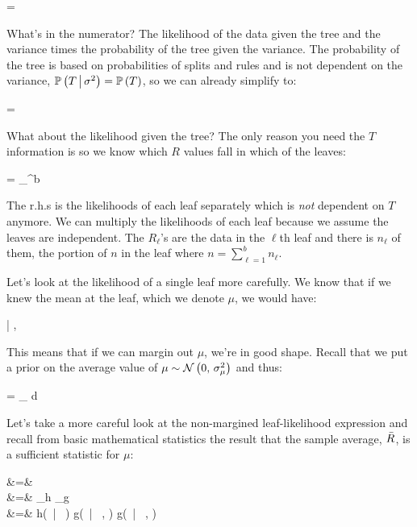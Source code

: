 \beqn
{} = 
\eeqn

What's in the numerator? The likelihood of the data given the tree and the variance times the probability of the tree given the variance. The probability of the tree is based on probabilities of splits and rules and is not dependent on the variance, $\mathbb{P}\left(T \, \big| \, \sigma^2\right) = \mathbb{P}\left(T\right)$, so we can already simplify to:

\beqn
{} = 
\eeqn

What about the likelihood given the tree? The only reason you need the $T$ information is so we know which $R$ values fall in which of the leaves:

\beqn
{} = \prod_{}^{b} \cprob{\Rlonetonl}{\sigsq}
\eeqn

The r.h.s is the likelihoods of each leaf separately which is \textit{not} dependent on $T$ anymore. We can multiply the likelihoods of each leaf because we assume the leaves are independent. The $R_\ell$'s are the data in the $\ell$th leaf and there is $n_\ell$ of them, the portion of $n$ in the leaf where $n = \sum_{\ell=1}^b n_\ell$.

Let's look at the likelihood of a single leaf more carefully. We know that if we knew the mean at the leaf, which we denote $\mu$, we would have:

\beqn
\Rlonetonl | \mu, \sigsq ~\iid~ \normnot{\mu}{\sigsq}
\eeqn

This means that if we can margin out $\mu$, we're in good shape. Recall that we put a prior on the average value of $\mu \sim \mathcal{N}\left(0,\,\sigma^2_\mu\right)$ and thus:

\beqn
\cprob{\Rlonetonl}{\sigsq} = \int_\reals \cprob{\Rlonetonl}{\mu, \sigsq} \prob{\mu; \sigsq_\mu} d\mu
\eeqn

Let's take a more careful look at the non-margined leaf-likelihood expression and recall from basic mathematical statistics the result that the sample average, $\bar{R}$, is a sufficient statistic for $\mu$:

\beqn
\prob{\Rlonetonl | \mu, \sigsq} &=&  ~ \\
&=& _h _g \\
&=& h(\Rlonetonl ~|~ \sigsq) \cdot g(\Rbar ~|~ \mu, \sigsq) \propto g(\Rbar ~|~ \mu, \sigsq)\\
\eeqn

